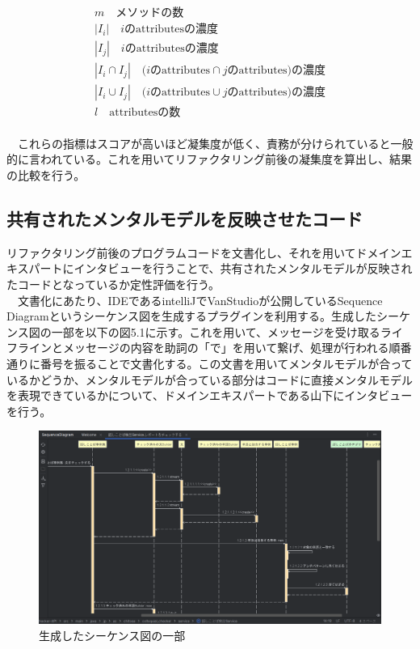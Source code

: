 \documentclass[12pt, a4paper]{jreport}
\begin{document}
\begin{gather*}
m\text{　メソッドの数}
\\|{I}_{i}|\text{　}i\text{のattributesの濃度}
\\|{I}_{j}|\text{　}i\text{のattributesの濃度}
\\|{I}_{i}\cap{I}_{j}|\text{　}(i\text{のattributes}\cap j\text{のattributes)の濃度}
\\|{I}_{i}\cup{I}_{j}|\text{　}(i\text{のattributes}\cup j\text{のattributes)の濃度}
\\l\text{　attributesの数}
\end{gather*}
\\　これらの指標はスコアが高いほど凝集度が低く、責務が分けられていると一般的に言われている。これを用いてリファクタリング前後の凝集度を算出し、結果の比較を行う。
\subsection{共有されたメンタルモデルを反映させたコード}
リファクタリング前後のプログラムコードを文書化し、それを用いてドメインエキスパートにインタビューを行うことで、共有されたメンタルモデルが反映されたコードとなっているか定性評価を行う。
\\　文書化にあたり、IDEであるintelliJでVanStudioが公開しているSequence Diagramというシーケンス図を生成するプラグインを利用する。生成したシーケンス図の一部を以下の図5.1に示す。これを用いて、メッセージを受け取るライフラインとメッセージの内容を助詞の「で」を用いて繋げ、処理が行われる順番通りに番号を振ることで文書化する。この文書を用いてメンタルモデルが合っているかどうか、メンタルモデルが合っている部分はコードに直接メンタルモデルを表現できているかについて、ドメインエキスパートである山下にインタビューを行う。
\begin{figure}[H]
\centering
\includegraphics[width=1\linewidth]{image/sequence.png}
\caption{生成したシーケンス図の一部}
\label{fig:enter-label}
\end{figure}
\end{document}
